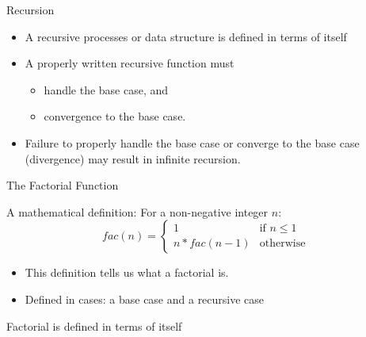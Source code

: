 \documentclass{beamer}
\author[Chris Simpkins]
{Christopher Simpkins \\\texttt{chris.simpkins@gatech.edu}}
\institute[Georgia Tech] %
\date[CS 1331]{}
\begin{document}
\begin{frame}
  \titlepage
\end{frame}


\begin{frame}[fragile]{Recursion}


\begin{itemize}
\item A recursive processes or data structure is defined in terms of itself
\item A properly written recursive function must
\begin{itemize}
\item handle the base case, and
\item convergence to the base case.
\end{itemize}
\item Failure to properly handle the base case or converge to the base case (divergence) may result in infinite recursion.
\end{itemize}


\end{frame}

\begin{frame}[fragile]{The Factorial Function}


A mathematical definition: For a non-negative integer $n$:
\begin{equation*}
    fac(n) = \begin{cases}
               1                   & \text{if } n \le 1\\
               n * fac(n-1)        & \text{otherwise}
           \end{cases}
\end{equation*}

\begin{itemize}
\item This definition tells us what a factorial is.
\item Defined in cases: a base case and a recursive case
\end{itemize}
 Factorial is defined in terms of itself

\end{frame}
\end{document}
